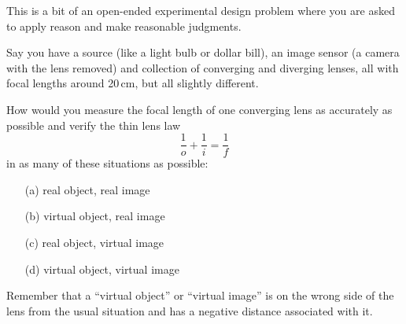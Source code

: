 \documentclass[11pt]{hmcpset}
\begin{document}
	\pagebreak
%
%	
%	
%
\begin{problem}

This is a bit of an open-ended experimental design problem where you are asked to apply reason and make reasonable judgments.

\vspace{1em}
Say you have a source (like a light bulb or dollar bill), an image sensor (a camera with the lens removed) and collection of converging and diverging lenses, all with focal lengths around 20\,cm, but all slightly different.

How would you measure the focal length of one converging lens as accurately as possible and verify the thin lens law
\[
\frac{1}{o} + \frac{1}{i} = \frac{1}{f}
\] 
in as many of these situations as possible:
\begin{itemize}
	\item[(a)] real object, real image
	\item[(b)] virtual object, real image
	\item[(c)] real object, virtual image
	\item[(d)] virtual object, virtual image
\end{itemize}
Remember that a ``virtual object'' or ``virtual image'' is on the wrong side of the lens from the usual situation and has a negative distance associated with it.


\end{problem}
\end{document}
